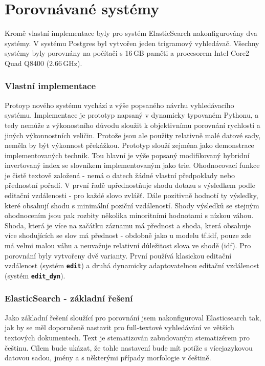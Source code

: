 \documentclass[11pt,letterpaper,oneside,openright]{book}
\newcommand{\bftt}[1]{\texttt{\textbf{#1}}}
\begin{document}
\section{Porovnávané systémy}
Kromě vlastní implementace byly pro systém ElasticSearch nakonfigurovány
dva systémy. V systému Postgres byl vytvořen jeden trigramový
vyhledávač. Všechny systémy byly porovnány na počítači s 16\,GB paměti a
procesorem Intel Core2 Quad Q8400 (2.66\,GHz).

\subsubsection{Vlastní implementace}
Protoyp nového systému vychází z výše popsaného návrhu vyhledávacího systému.
Implementace je prototyp napsaný v dynamicky typovaném Pythonu, a tedy nemůže z
výkonostního důvodu sloužit k objektivnímu porovnání rychlosti a jiných
výkonnostních veličin. Protože jsou ale použity relativně malé datové sady,
neměla by být výkonnost překážkou. Prototyp slouží zejména jako demonstrace
implementovaných technik. Tou hlavní je výše popsaný modifikovaný hybridní
invertovaný index se slovníkem implementovaným jako trie. Ohodnocovací funkce
je čistě textově založená - nemá o datech žádné vlastní předpoklady nebo
přednostní pořadí. V první řadě upřednostňuje shodu dotazu s výsledkem podle
editační vzdálenosti - pro každé slovo zvlášť. Dále pozitivně hodnotí ty
výsledky, které obsahují shodu s minimální poziční vzdáleností.  Shody výsledků
se stejným ohodnocením jsou pak rozbity několika minoritními hodnotami s nízkou
váhou. Shoda, která je více na začátku záznamu má přednost a shoda, která
obsahuje více shodujících se slov má přednost - obdobně jako u modelu tf.idf,
pouze zde má velmi malou váhu a neuvažuje relativní důležitost slova ve shodě
(idf). Pro porovnání byly vytvořeny dvě varianty. První používá klasickou
editační vzdálenost (systém \bftt{edit}) a druhá dynamicky adaptovatelnou
editační vzdálenost (systém \bftt{edit\_dyn}).

\subsubsection{ElasticSearch - základní řešení}
Jako základní řešení sloužící pro porovnání jsem nakonfiguroval Elasticsearch
tak, jak by se měl doporučeně nastavit pro full-textové vyhledávání ve větších
textových dokumentech. Text je stematizován zabudovaným stematizérem pro
češtinu. Cílem bude ukázat, že tohle nastavení bude mít potíže s vícejazykovou
datovou sadou, jmény a s některými případy morfologie v češtině.
\end{document}
